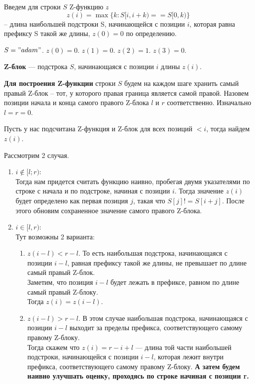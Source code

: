 Введем для строки $S$ Z-функцию $z$ 
\[
	z(i) = \max \{k: S[i, i + k) == S[0, k)\}
\]
-- длина наибольшей подстроки S, начинающейся с позиции $i$, которая равна префиксу S такой же длины, $z(0) = 0$ по определению.

\begin{example}
	$S = "adam"$. 
	$z(0) = 0.$
	$z(1) = 0.$
	$z(2) = 1.$ 
	$z(3) = 0.$
\end{example}

\begin{Def}
	\textbf{Z-блок} --- подстрока $S$, начинающаяся с позиции  $i$ длины  $z(i)$.
\end{Def}

\textbf{Для построения Z-функции} строки $S$ будем на каждом шаге хранить самый правый  Z-блок -- тот, у которого правая граница является самой правой.
Назовем позиции начала и конца самого правого Z-блока $l$ и  $r$ соответственно. Изначально $l = r = 0$. 

Пусть у нас подсчитана Z-функция и Z-блок для всех позиций $< i$, тогда найдем  $z(i)$.

Рассмотрим 2 случая. 
\begin{enumerate}
	\item \underline{$i \notin [l; r)$}: \\
		Тогда нам придется считать функцию наивно, пробегая двумя указателями по строке с начала и по подстроке, начиная с позиции $i$. Тогда значение $z(i)$ будет определено как первая позиция $j$, такая что  $S[j] != S[i + j]$.
		После этого обновим сохраненное значение самого правого Z-блока.
	\item \underline{$i \in [l, r)$}: \\
		Тут возможны 2 варианта:
		\begin{enumerate}
			\item \underline{$z(i - l) < r - l$}. То есть наибольшая подстрока, начинающаяся с позиции $i - l$, равная префиксу такой же длины, не превышает по длине самый правый Z-блок. \\
				Заметим, что позиция $i - l$ будет лежать в префиксе, равном по длине самый правый Z-блоку. \\
				Тогда $z(i) = z(i - l)$. \\
		\item \underline{$z(i - l) > r - l$}. В этом случае наибольшая подстрока, начинающаяся с позиции $i - l$ выходит за пределы префикса, соответствующего самому правому Z-блоку. \\
				Тогда скажем  что $z(i) = r - i + l$ --- длина той части наибольшей подстроки, начинающейся с позиции  $i - l$, которая лежит внутри префикса, соответствующего самому правому Z-блоку. \textbf{А затем будем наивно улучшать оценку, проходясь по строке начиная с позиции r.}
		\end{enumerate}
\end{enumerate}

